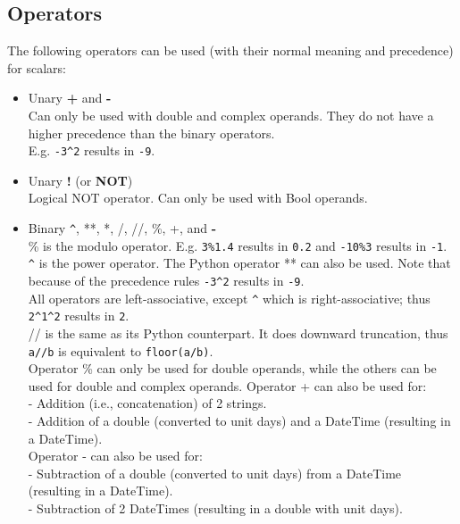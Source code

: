 \subsection{\label{TAQL:OPERATORS}Operators}
The following operators can be used (with their normal meaning and
precedence) for scalars:
\begin{itemize}
  \item Unary \textbf{+} and \textbf{-}
       \\Can only be used with double and complex operands.
       They do not have a higher precedence than the binary operators.
       \\E.g. \texttt{-3}\verb+^+\texttt{2} results in \texttt{-9}.
  \item Unary \textbf{!} (or \textbf{NOT})
       \\Logical NOT operator.
       Can only be used with Bool operands.
  \item Binary \verb+^+, **, *, /, //, \%, +, and \textbf{-}
       \\\% is the modulo operator.
       E.g. \texttt{3\%1.4} results in \texttt{0.2} and
       \texttt{-10\%3} results in \texttt{-1}.
       \\\verb+^+ is the power operator. The Python operator ** can
       also be used.
       Note that because of the precedence rules
       \texttt{-3}\verb+^+\texttt{2} results in \texttt{-9}.
       \\All operators are left-associative, except \verb+^+ which is
       right-associative; thus
       \texttt{2}\verb+^+\texttt{1}\verb+^+\texttt{2} results in
       \texttt{2}.
       \\// is the same as its Python counterpart. It does downward
       truncation, thus \texttt{a//b} is equivalent to \texttt{floor(a/b)}.
       \\Operator \% can only be used for double operands, while the others
       can be used for double and complex operands.
       Operator + can also be used for:
       \\- Addition (i.e., concatenation) of 2 strings.
       \\- Addition of a double (converted to unit days) and a DateTime
       (resulting in a DateTime).
       \\Operator - can also be used for:
       \\- Subtraction of a double (converted to unit days) from a DateTime
       (resulting in a DateTime).
       \\- Subtraction of 2 DateTimes (resulting in a double with unit days).

\end{itemize}
